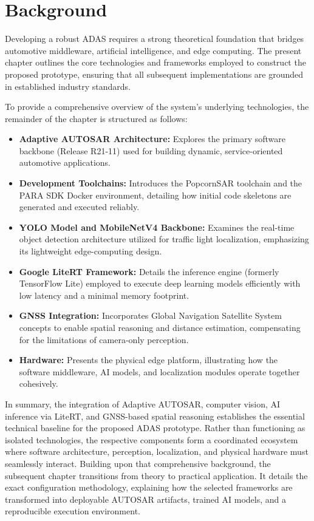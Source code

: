 \chapter{Background}

Developing a robust ADAS requires a strong theoretical foundation that bridges automotive middleware, artificial intelligence, and edge computing. The present chapter outlines the core technologies and frameworks employed to construct the proposed prototype, ensuring that all subsequent implementations are grounded in established industry standards. 

To provide a comprehensive overview of the system's underlying technologies, the remainder of the chapter is structured as follows:

\begin{itemize}
    \item \textbf{Adaptive AUTOSAR Architecture:} Explores the primary software backbone (Release R21-11) used for building dynamic, service-oriented automotive applications.
    \item \textbf{Development Toolchains:} Introduces the PopcornSAR toolchain and the PARA SDK Docker environment, detailing how initial code skeletons are generated and executed reliably.
    \item \textbf{YOLO Model and MobileNetV4 Backbone:} Examines the real-time object detection architecture utilized for traffic light localization, emphasizing its lightweight edge-computing design.
    \item \textbf{Google LiteRT Framework:} Details the inference engine (formerly TensorFlow Lite) employed to execute deep learning models efficiently with low latency and a minimal memory footprint.
    \item \textbf{GNSS Integration:} Incorporates Global Navigation Satellite System concepts to enable spatial reasoning and distance estimation, compensating for the limitations of camera-only perception.
    \item \textbf{Hardware:} Presents the physical edge platform, illustrating how the software middleware, AI models, and localization modules operate together cohesively.
\end{itemize}








In summary, the integration of Adaptive AUTOSAR, computer vision, AI inference via LiteRT, and GNSS-based spatial reasoning establishes the essential technical baseline for the proposed ADAS prototype. Rather than functioning as isolated technologies, the respective components form a coordinated ecosystem where software architecture, perception, localization, and physical hardware must seamlessly interact. Building upon that comprehensive background, the subsequent chapter transitions from theory to practical application. It details the exact configuration methodology, explaining how the selected frameworks are transformed into deployable AUTOSAR artifacts, trained AI models, and a reproducible execution environment.


% 

